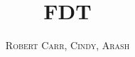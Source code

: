 \documentclass[11pt]{article}
\theoremstyle{plain}
\theoremstyle{definition}
\theoremstyle{claim}
\theoremstyle{remark}
\theoremstyle{remark}
\theoremstyle{remark}
\begin{document}
{}

\title{FDT}

\author{\textsc{Robert Carr, Cindy, Arash} } \maketitle 

\begin{abstract}

\end{abstract}
\nocite{schrijver}










\appendix


\end{document}
